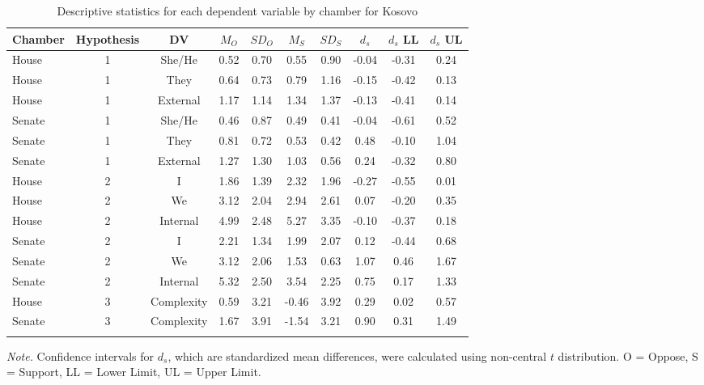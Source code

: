 \documentclass[english,,man]{apa6}
\begin{document}
\begin{table}[tbp]

\begin{center}
\begin{threeparttable}

\caption{\label{tab:Ktable}Descriptive statistics for each dependent variable by chamber for Kosovo}

\small{

\begin{tabular}{lccccccccc}
\toprule
Chamber & Hypothesis & DV & $M_O$ & $SD_O$ & $M_S$ & $SD_S$ & $d_s$ & $d_s$ LL & $d_s$ UL\\
\midrule
House & 1 & She/He & 0.52 & 0.70 & 0.55 & 0.90 & -0.04 & -0.31 & 0.24\\
House & 1 & They & 0.64 & 0.73 & 0.79 & 1.16 & -0.15 & -0.42 & 0.13\\
House & 1 & External & 1.17 & 1.14 & 1.34 & 1.37 & -0.13 & -0.41 & 0.14\\
Senate & 1 & She/He & 0.46 & 0.87 & 0.49 & 0.41 & -0.04 & -0.61 & 0.52\\
Senate & 1 & They & 0.81 & 0.72 & 0.53 & 0.42 & 0.48 & -0.10 & 1.04\\
Senate & 1 & External & 1.27 & 1.30 & 1.03 & 0.56 & 0.24 & -0.32 & 0.80\\
House & 2 & I & 1.86 & 1.39 & 2.32 & 1.96 & -0.27 & -0.55 & 0.01\\
House & 2 & We & 3.12 & 2.04 & 2.94 & 2.61 & 0.07 & -0.20 & 0.35\\
House & 2 & Internal & 4.99 & 2.48 & 5.27 & 3.35 & -0.10 & -0.37 & 0.18\\
Senate & 2 & I & 2.21 & 1.34 & 1.99 & 2.07 & 0.12 & -0.44 & 0.68\\
Senate & 2 & We & 3.12 & 2.06 & 1.53 & 0.63 & 1.07 & 0.46 & 1.67\\
Senate & 2 & Internal & 5.32 & 2.50 & 3.54 & 2.25 & 0.75 & 0.17 & 1.33\\
House & 3 & Complexity & 0.59 & 3.21 & -0.46 & 3.92 & 0.29 & 0.02 & 0.57\\
Senate & 3 & Complexity & 1.67 & 3.91 & -1.54 & 3.21 & 0.90 & 0.31 & 1.49\\
\bottomrule
\addlinespace
\end{tabular}

}

\begin{tablenotes}[para]
\normalsize{\textit{Note.} Confidence intervals for $d_s$, which are standardized mean differences, were calculated using non-central $t$ distribution. O = Oppose, S = Support, LL = Lower Limit, UL = Upper Limit.}
\end{tablenotes}

\end{threeparttable}
\end{center}

\end{table}
\end{document}
